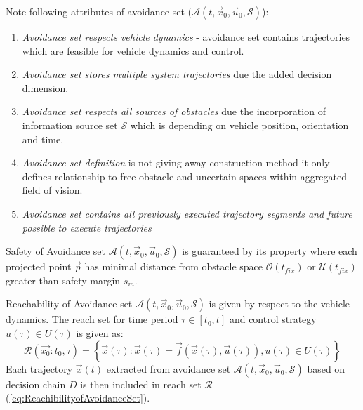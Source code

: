     \begin{note} Note following attributes of avoidance set ($\mathscr{A}(t,\vec{x}_0,\vec{u}_0,\mathscr{S})$):
    \begin{enumerate}
        \item \emph{Avoidance set respects vehicle dynamics} - avoidance set contains trajectories which are feasible for vehicle dynamics and control.
        \item \emph{Avoidance set stores multiple system trajectories} due the added decision dimension.
        \item \emph{Avoidance set respects all sources of obstacles} due the incorporation of information source set $\mathscr{S}$ which is depending on vehicle position, orientation and time.
        \item \emph{Avoidance set definition} is not giving away construction method it only defines relationship to free obstacle and uncertain spaces within aggregated field of vision.
        \item \emph{Avoidance set contains all previously executed trajectory segments and future possible to execute trajectories}
    \end{enumerate}
    \end{note}
    
    \begin{definition}{Safety of Avoidance set $\mathscr{A}(t,\vec{x}_0,\vec{u}_0,\mathscr{S})$} is guaranteed by its property where each projected point $\vec{p}$ has minimal distance from obstacle space $\mathscr{O}(t_{fix})$ or $\mathscr{U}(t_{fix})$ greater than safety margin $s_m$.
    \end{definition}
    
    \begin{definition}{Reachability of Avoidance set $\mathscr{A}(t,\vec{x}_0,\vec{u}_0,\mathscr{S})$} is given by respect to the vehicle dynamics. The reach set for time period $\tau\in[t_0,t]$ and control strategy $u(\tau)\in U(\tau)$ is given as:
    \begin{equation}\label{eq:ReachibilityofAvoidanceSet}
        \mathscr{R}(\vec{x_0}:t_0,\tau)=\left\{\vec{x}(\tau):\vec{x}(\tau)=\vec{f}(\vec{x}(\tau),\vec{u}(\tau)),u(\tau)\in U(\tau)\right\}
    \end{equation}
    Each trajectory $\vec{x}(t)$ extracted from avoidance set $\mathscr{A}(t,\vec{x}_0,\vec{u}_0,\mathscr{S})$ based on decision chain $D$ is then included in reach set $\mathscr{R}$ (\ref{eq:ReachibilityofAvoidanceSet}).
    \end{definition}
    
